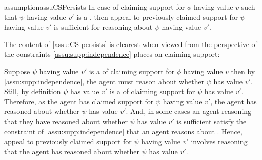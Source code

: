 \begin{note}[Assumption]
  \begin{restatable}{assumption}{assuCSPersists}
    \label{assu:CS-persists}
    In case of claiming support for \(\phi\) having value \(v\) such that \(\psi\) having value \(v'\) is a \requ{}, then appeal to previously claimed support for \(\psi\) having value \(v'\) is sufficient for reasoning about \(\psi\) having value \(v'\).
  \end{restatable}
\end{note}

\begin{note}[Intuition]
  The content of \autoref{assu:CS-persists} is clearest when viewed from the perspective of the constraints \autoref{assu:supp:independence} places on claiming support:

  Suppose \(\psi\) having value \(v'\) is a \requ{} of claiming support for \(\phi\) having value \(v\) then by \autoref{assu:supp:independence}, the agent must reason about whether \(\psi\) has value \(v'\).
  Still, by definition \(\psi\) has value \(v'\) is a \requ{} of claiming support for \(\psi\) has value \(v'\).
  Therefore, as the agent has claimed support for \(\psi\) having value \(v'\), the agent has reasoned about whether \(\psi\) has value \(v'\).
  And, in some cases an agent reasoning that they have reasoned about whether \(\psi\) has value \(v'\) is sufficient satisfy the constraint of \autoref{assu:supp:independence} that an agent reasons about .
  Hence, appeal to previously claimed support for \(\psi\) having value \(v'\) involves reasoning that the agent has reasoned about whether \(\psi\) has value \(v'\).
\end{note}

